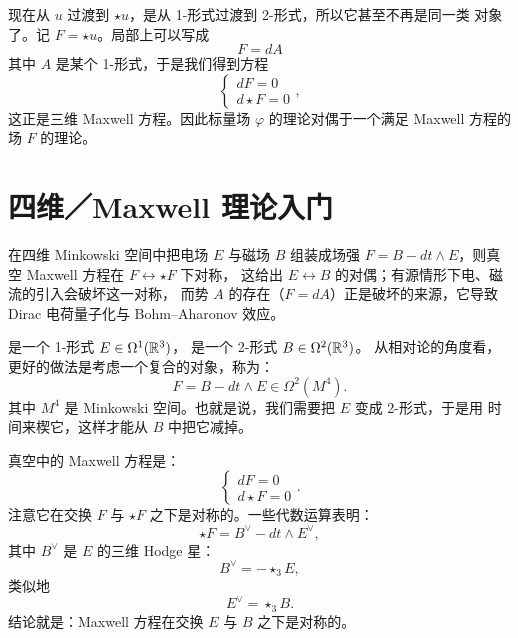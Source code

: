 现在从 $u$ 过渡到 $\star u$，是从 1-形式过渡到 2-形式，所以它甚至不再是同一类
对象了。记 $F=\star u$。局部上可以写成
\begin{equation}\tag{4.4}
F=dA
\end{equation}
其中 $A$ 是某个 1-形式，于是我们得到方程
\begin{equation}\tag{4.5}
\begin{cases}
dF=0\\
d\star F=0
\end{cases},
\end{equation}
这正是三维 Maxwell 方程。因此标量场 $\varphi$ 的理论对偶于一个满足 Maxwell
方程的场 $F$ 的理论。

\section{四维／Maxwell 理论入门}
\begin{sectionkey}
在四维 Minkowski 空间中把电场 $E$ 与磁场 $B$ 组装成场强
$F=B-dt\wedge E$，则真空 Maxwell 方程在 $F\leftrightarrow\star F$ 下对称，
这给出 $E\leftrightarrow B$ 的对偶；有源情形下电、磁流的引入会破坏这一对称，
而势 $A$ 的存在（$F=dA$）正是破坏的来源，它导致 Dirac 电荷量子化与
Bohm--Aharonov 效应。
\end{sectionkey}

是一个 1-形式 $E\in\Omega^{1}(\mathbb{R}^{3})$，
是一个 2-形式 $B\in\Omega^{2}(\mathbb{R}^{3})$。
从相对论的角度看，更好的做法是考虑一个复合的对象，称为：
\begin{equation}\tag{4.6}
F=B-dt\wedge E\in\Omega^{2}(M^{4}).
\end{equation}
其中 $M^{4}$ 是 Minkowski 空间。也就是说，我们需要把 $E$ 变成 2-形式，于是用
时间来楔它，这样才能从 $B$ 中把它减掉。

真空中的 Maxwell 方程是：
\begin{equation}\tag{4.7}
\begin{cases}
dF=0\\
d\star F=0
\end{cases}.
\end{equation}
注意它在交换 $F$ 与 $\star F$ 之下是对称的。一些代数运算表明：
\begin{equation}\tag{4.8}
\star F=B^{\vee}-dt\wedge E^{\vee},
\end{equation}
其中 $B^{\vee}$ 是 $E$ 的三维 Hodge 星：
\begin{equation}\tag{4.9}
B^{\vee}=-\star_{3}E,
\end{equation}
类似地
\begin{equation}\tag{4.10}
E^{\vee}=\star_{3}B.
\end{equation}
结论就是：Maxwell 方程在交换 $E$ 与 $B$ 之下是对称的。

